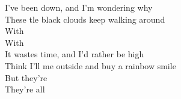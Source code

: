 \songwordfb{} I've been down, and I'm wondering why \\ 
These tle black clouds keep walking around \\
With  \\
With  \\
\songwordfb{} It wastes time, and I'd rather be high \\
Think I'll  me outside and buy a rainbow smile \\
But they're  \\
They're all  \\

